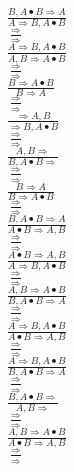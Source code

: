 \documentclass[11pt]{article}
\begin{document}
\begin{center}

$\frac{B, A\bullet B\Rightarrow A}{A\Rightarrow B, A\bullet B}$
\bigskip
\\$\frac{\Rightarrow }{\Rightarrow }$
\bigskip
\\$\frac{A\Rightarrow B, A\bullet B}{A, B\Rightarrow A\bullet B}$
\bigskip
\\$\frac{\Rightarrow }{\Rightarrow }$
\bigskip
\\$\frac{B\Rightarrow A\bullet B}{B\Rightarrow A}$
\bigskip
\\$\frac{\Rightarrow }{\Rightarrow }$
\bigskip
\\$\frac{\Rightarrow A, B}{\Rightarrow B, A\bullet B}$
\bigskip
\\$\frac{\Rightarrow }{\Rightarrow }$
\bigskip
\\$\frac{A, B\Rightarrow }{B, A\bullet B\Rightarrow }$
\bigskip
\\$\frac{\Rightarrow }{\Rightarrow }$
\bigskip
\\$\frac{B\Rightarrow A}{B\Rightarrow A\bullet B}$
\bigskip
\\$\frac{\Rightarrow }{\Rightarrow }$
\bigskip
\\$\frac{B, A\bullet B\Rightarrow A}{A\bullet B\Rightarrow A, B}$
\bigskip
\\$\frac{\Rightarrow }{\Rightarrow }$
\bigskip
\\$\frac{A\bullet B\Rightarrow A, B}{A\Rightarrow B, A\bullet B}$
\bigskip
\\$\frac{\Rightarrow }{\Rightarrow }$
\bigskip
\\$\frac{A, B\Rightarrow A\bullet B}{B, A\bullet B\Rightarrow A}$
\bigskip
\\$\frac{\Rightarrow }{\Rightarrow }$
\bigskip
\\$\frac{A\Rightarrow B, A\bullet B}{A\bullet B\Rightarrow A, B}$
\bigskip
\\$\frac{\Rightarrow }{\Rightarrow }$
\bigskip
\\$\frac{A\Rightarrow B, A\bullet B}{B, A\bullet B\Rightarrow A}$
\bigskip
\\$\frac{\Rightarrow }{\Rightarrow }$
\bigskip
\\$\frac{B, A\bullet B\Rightarrow }{A, B\Rightarrow }$
\bigskip
\\$\frac{\Rightarrow }{\Rightarrow }$
\bigskip
\\$\frac{A, B\Rightarrow A\bullet B}{A\bullet B\Rightarrow A, B}$
\bigskip
\\$\frac{\Rightarrow }{\Rightarrow }$

\end{center}
\end{document}
